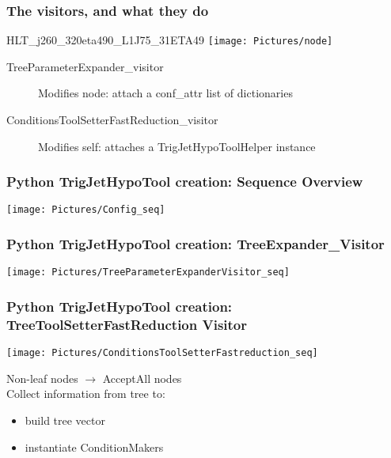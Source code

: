 \documentclass{beamer}
\begin{document}
  
\frame
{
  \frametitle{The visitors, and what they do}
\begin{block}{HLT\_j260\_320eta490\_L1J75\_31ETA49}
 \texttt{[image: Pictures/node]}

 \begin{description}
\item[TreeParameterExpander\_visitor] Modifies  node: attach a conf\_attr list of dictionaries
\end{description}
\end{block}
\begin{block}{}
 \begin{description}
 \item[ConditionsToolSetterFastReduction\_visitor] Modifies self: attaches  a TrigJetHypoToolHelper instance
 \end{description}
 \end{block}
 }
 
 \frame
{
  \frametitle{Python TrigJetHypoTool creation: Sequence Overview}
  \begin{block}{}
   \texttt{[image: Pictures/Config\_seq]}
   \end{block}
 }
 
  
 \frame
{
  \frametitle{Python TrigJetHypoTool creation: TreeExpander\_Visitor}
  \begin{block}{}
   \texttt{[image: Pictures/TreeParameterExpanderVisitor\_seq]}
   \end{block}
 }
 
  \frame
{
  \frametitle{Python TrigJetHypoTool creation: TreeToolSetterFastReduction Visitor}
  \begin{block}{}
         \begin{minipage}[T]{0.45\linewidth}
	   \texttt{[image: Pictures/ConditionsToolSetterFastreduction\_seq]}
	 \end{minipage}%
	 \begin{minipage}[T]{0.55\linewidth}
	 Non-leaf nodes $\rightarrow$ AcceptAll nodes\\
	 Collect information from tree to:
	 \begin{itemize}
		\item build tree vector
		\item instantiate ConditionMakers
	\end{itemize}
	 \end{minipage}

   \end{block}
 }

 

 
\end{document}
